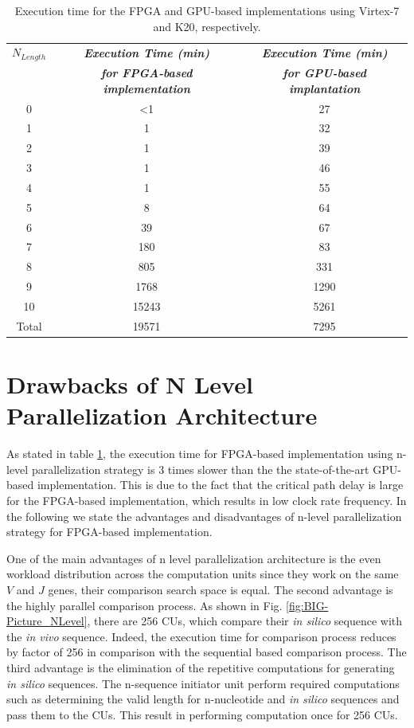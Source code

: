 \begin{table}[t!]
\caption{Execution time for the FPGA and GPU-based implementations using Virtex-7 and K20, respectively.}
\begin{center}
\begin{tabular}{ |c|c|c|}
  \hline
  \textbf{\textit{ $N_{Length}$}} & \textbf{\textit{Execution Time (min)}} &\textbf{\textit{Execution Time (min)}} \\
  ~&\textbf{\textit{for FPGA-based implementation}}& \textbf{\textit{for GPU-based implantation}} \\	\hline
	0	&\textless 1	 	& 27  \\	\hline	
	1	&1	 	& 32  \\	\hline	
	2	&1	& 39 \\	\hline	
	3	&1	 	& 46 \\	\hline	
	4	&1	 	& 55 \\	\hline	
	5	&8	  & 64 \\	\hline	
	6	&39   &67     \\	\hline
	7	&180  &83    \\	\hline
	8	&805 &331    \\	\hline
	9	&1768 & 1290   \\	\hline
	10	& 15243  & 5261  \\	\hline	
   	Total & 19571& 7295 \\	
  \hline
\end{tabular}
  \label{tab:4}
\end{center}
\end{table}

\section{Drawbacks of N Level Parallelization Architecture}\label{sec:drawbackNlevel}
As stated in table \ref{tab:4}, the execution time for FPGA-based implementation using n-level parallelization strategy is 3 times slower than the the state-of-the-art GPU-based implementation. This is due to the fact that the critical path delay is large for the FPGA-based implementation, which results in low clock rate frequency. In the following we state the advantages and disadvantages of n-level parallelization strategy for FPGA-based implementation.
 
One of the main advantages of n level parallelization architecture is the even workload distribution across the computation units since they work on the same $V$ and $J$ genes, their comparison search space is equal. The second advantage is the highly parallel comparison process. As shown in Fig. \ref{fig:BIG-Picture_NLevel}, there are 256 CUs, which compare their \emph{in silico} sequence with the \emph{in vivo} sequence. Indeed, the execution time for comparison process reduces by factor of 256 in comparison with the sequential based comparison process. The third advantage is the elimination of the repetitive computations for generating \emph{in silico} sequences. The n-sequence initiator unit perform required computations such as determining the valid length for n-nucleotide and \emph{in silico} sequences and pass them to the CUs. This result in performing computation once for 256 CUs.


